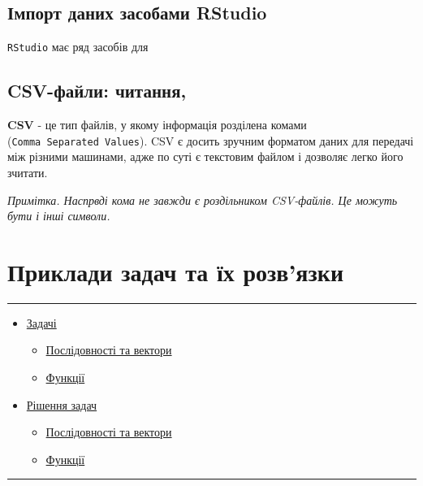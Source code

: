 \documentclass[
]{book}
\providecommand{\tightlist}{%
  \setlength{\itemsep}{0pt}\setlength{\parskip}{0pt}}
\begin{document}
\hypertarget{chapter321}{%
\section{Імпорт даних засобами RStudio}\label{chapter321}}

\texttt{RStudio} має ряд засобів для

\hypertarget{chapter321}{%
\section{CSV-файли: читання,}\label{chapter321}}

\textbf{CSV} - це тип файлів, у якому інформація розділена комами (\texttt{Comma\ Separated\ Values}). CSV є досить зручним форматом даних для передачі між різними машинами, адже по суті є текстовим файлом і дозволяє легко його зчитати.

\emph{Примітка. Наспрвді кома не завжди є роздільником CSV-файлів. Це можуть бути і інші символи.}

\hypertarget{chapter6}{%
\chapter{Приклади задач та їх розв'язки}\label{chapter6}}

\begin{center}\rule{0.5\linewidth}{0.5pt}\end{center}

\begin{itemize}
\tightlist
\item
  \protect\hyperlink{chapter61}{Задачі}

  \begin{itemize}
  \tightlist
  \item
    \protect\hyperlink{chapter611}{Послідовності та вектори}
  \item
    \protect\hyperlink{chapter612}{Функції}
  \end{itemize}
\item
  \protect\hyperlink{chapter62}{Рішення задач}

  \begin{itemize}
  \tightlist
  \item
    \protect\hyperlink{chapter621}{Послідовності та вектори}
  \item
    \protect\hyperlink{chapter622}{Функції}
  \end{itemize}
\end{itemize}

\begin{center}\rule{0.5\linewidth}{0.5pt}\end{center}
\end{document}
